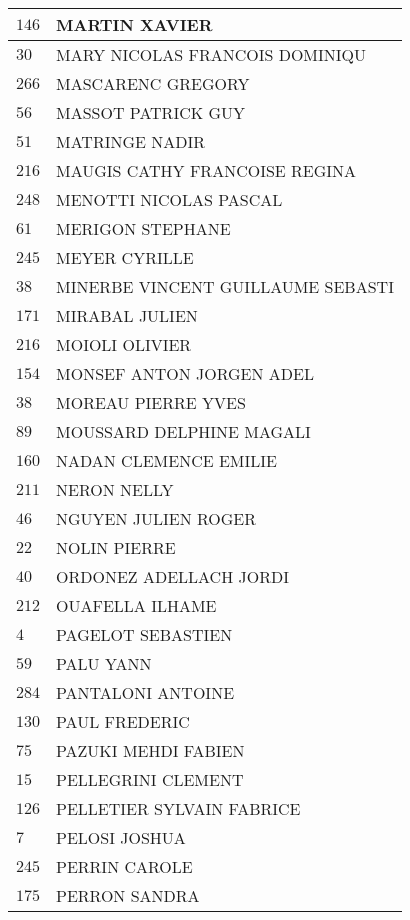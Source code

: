 \begin{xltabular}{\linewidth}{|l|X|}
    \hline
    $146$ & MARTIN XAVIER \\
    \hline
    $30$ & MARY NICOLAS FRANCOIS DOMINIQU \\
    \hline
    $266$ & MASCARENC GREGORY \\
    \hline
    $56$ & MASSOT PATRICK GUY \\
    \hline
    $51$ & MATRINGE NADIR \\
    \hline
    $216$ & MAUGIS CATHY FRANCOISE REGINA \\
    \hline
    $248$ & MENOTTI NICOLAS PASCAL \\
    \hline
    $61$ & MERIGON STEPHANE \\
    \hline
    $245$ & MEYER CYRILLE \\
    \hline
    $38$ & MINERBE VINCENT GUILLAUME SEBASTI \\
    \hline
    $171$ & MIRABAL JULIEN \\
    \hline
    $216$ & MOIOLI OLIVIER \\
    \hline
    $154$ & MONSEF ANTON JORGEN ADEL \\
    \hline
    $38$ & MOREAU PIERRE YVES \\
    \hline
    $89$ & MOUSSARD DELPHINE MAGALI \\
    \hline
    $160$ & NADAN CLEMENCE EMILIE \\
    \hline
    $211$ & NERON NELLY \\
    \hline
    $46$ & NGUYEN JULIEN ROGER \\
    \hline
    $22$ & NOLIN PIERRE \\
    \hline
    $40$ & ORDONEZ ADELLACH JORDI \\
    \hline
    $212$ & OUAFELLA ILHAME \\
    \hline
    $4$ & PAGELOT SEBASTIEN \\
    \hline
    $59$ & PALU YANN \\
    \hline
    $284$ & PANTALONI ANTOINE \\
    \hline
    $130$ & PAUL FREDERIC \\
    \hline
    $75$ & PAZUKI MEHDI FABIEN \\
    \hline
    $15$ & PELLEGRINI CLEMENT \\
    \hline
    $126$ & PELLETIER SYLVAIN FABRICE \\
    \hline
    $7$ & PELOSI JOSHUA \\
    \hline
    $245$ & PERRIN CAROLE \\
    \hline
    $175$ & PERRON SANDRA \\

\end{xltabular}
